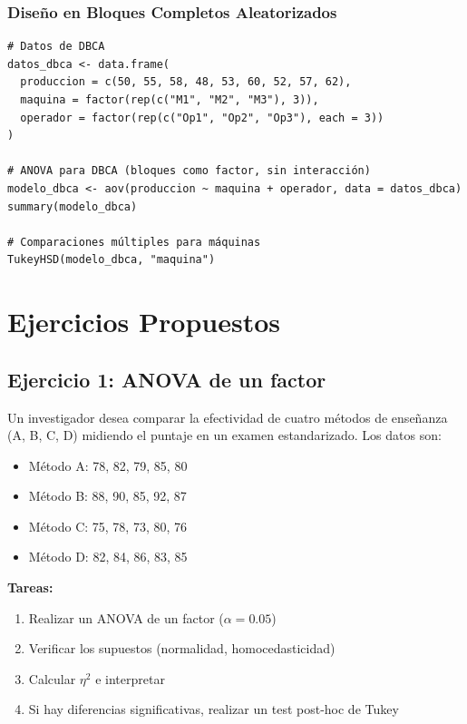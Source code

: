 \documentclass[11pt,a4paper]{article}
\theoremstyle{definition}
\begin{document}
\subsubsection{Diseño en Bloques Completos Aleatorizados}

\begin{lstlisting}[style=rstyle, caption=DBCA en R]
# Datos de DBCA
datos_dbca <- data.frame(
  produccion = c(50, 55, 58, 48, 53, 60, 52, 57, 62),
  maquina = factor(rep(c("M1", "M2", "M3"), 3)),
  operador = factor(rep(c("Op1", "Op2", "Op3"), each = 3))
)

# ANOVA para DBCA (bloques como factor, sin interacción)
modelo_dbca <- aov(produccion ~ maquina + operador, data = datos_dbca)
summary(modelo_dbca)

# Comparaciones múltiples para máquinas
TukeyHSD(modelo_dbca, "maquina")
\end{lstlisting}

\section{Ejercicios Propuestos}

\subsection{Ejercicio 1: ANOVA de un factor}

Un investigador desea comparar la efectividad de cuatro métodos de enseñanza (A, B, C, D) midiendo el puntaje en un examen estandarizado. Los datos son:

\begin{itemize}
    \item Método A: 78, 82, 79, 85, 80
    \item Método B: 88, 90, 85, 92, 87
    \item Método C: 75, 78, 73, 80, 76
    \item Método D: 82, 84, 86, 83, 85
\end{itemize}

\textbf{Tareas:}
\begin{enumerate}
    \item Realizar un ANOVA de un factor ($\alpha = 0.05$)
    \item Verificar los supuestos (normalidad, homocedasticidad)
    \item Calcular $\eta^2$ e interpretar
    \item Si hay diferencias significativas, realizar un test post-hoc de Tukey
\end{enumerate}
\end{document}
